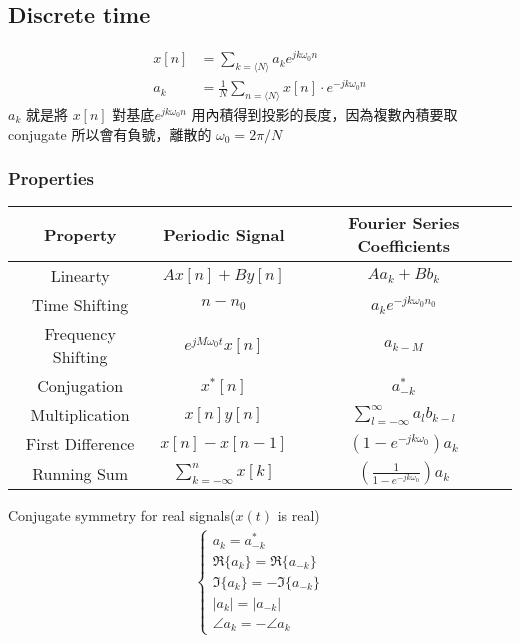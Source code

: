 \documentclass[12pt, a4paper]{article}
\begin{document}
\subsection*{Discrete time}
\begin{align*}
	x[n] &= \sum_{k=\langle N \rangle}a_ke^{jk\omega_0n}\\
	a_k &= \frac{1}{N} \sum_{n=\langle N \rangle} x[n] \cdot e^{-jk\omega_0n}
\end{align*}
$a_k$ 就是將 $x[n]$ 對基底$e^{jk\omega_0n}$ 用內積得到投影的長度，因為複數內積要取 conjugate 所以會有負號，離散的 $\omega_0 = 2\pi / N$
\subsubsection*{Properties}

\begin{center}
	\begin{tabular} { |c|c c| }
		\hline
		Property & Periodic Signal & Fourier Series Coefficients \\
		\hline
		Linearty & $Ax[n] + By[n]$ & $Aa_k + Bb_k$ \\
		Time Shifting & $n-n_0$ & $a_ke^{-jk\omega_0n_0}$ \\
		Frequency Shifting & $e^{jM\omega_0t}x[n]$ & $a_{k-M}$ \\
		Conjugation & $x^*[n]$ & $a^*_{-k}$ \\
		Multiplication & $x[n]y[n]$ & $\sum_{l=-\infty}^{\infty}a_l b_{k-l}$ \\
		First Difference & $x[n] - x[n-1]$ & $(1-e^{-jk\omega_0})a_k$ \\
		Running Sum & $\sum_{k = -\infty}^{n} x[k]$ & $\left(\frac{1}{1-e^{-jk\omega_0}}\right)a_k$ \\
		\hline
	\end{tabular}
\end{center}
Conjugate symmetry for real signals($x(t)$ is real)
\begin{align*}
	\begin{cases}
		a_k = a^*_{-k} \\
		\Re \{a_k\} = \Re \{a_{-k}\} \\
		\Im  \{a_k\} = -\Im \{a_{-k}\} \\
		\left|a_k\right| = \left|a_{-k}\right| \\
		\angle a_k = -\angle a_k
	\end{cases}
\end{align*}
\end{document}
